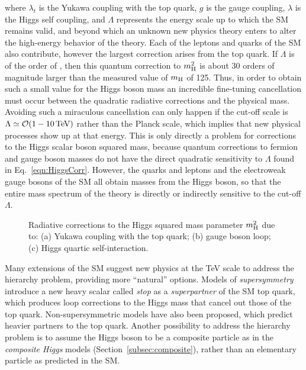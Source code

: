 \noindent where $\lambda_t$ is the Yukawa coupling with the top quark, $g$ is the gauge coupling, $\lambda$ is the Higgs self coupling, and $\Lambda$ represents the energy scale up to which the SM remains valid, and beyond which an unknown new physics theory enters to alter the high-energy behavior of the theory.
Each of the leptons and quarks of the SM also contribute, however the largest correction arises from the top quark.
If $\Lambda$ is of the order of \MPl, then this quantum correction to $m^2_\mathrm{H}$ is about 30 orders of magnitude larger than the measured value of $m_\mathrm{H}$ of 125\GeV.
Thus, in order to obtain such a small value for the Higgs boson mass an incredible fine-tuning cancellation must occur between the quadratic radiative corrections and the physical mass.
Avoiding such a miraculous cancellation can only happen if the cut-off scale is $\Lambda \simeq \mathcal{O}(1 - 10\,\text{Te\hspace{-.08em}V})$ rather than the Planck scale, which implies that new physical processes show up at that energy.
This is only directly a problem for corrections to the Higgs scalar boson squared mass, because quantum corrections to fermion and gauge boson masses do not have the direct
quadratic sensitivity to $\Lambda$ found in Eq.~\ref{eqn:HiggsCorr}. However, the quarks and leptons and the electroweak gauge bosons of the SM all obtain masses from the Higgs boson,
so that the entire mass spectrum of the theory is directly or indirectly sensitive to the cut-off $\Lambda$.

\begin{figure}[!htb]
 \centering
 \caption{Radiative corrections to the Higgs squared mass parameter $m^2_\mathrm{H}$ due to: (a) Yukawa coupling with the top quark; (b) gauge boson loop; (c) Higgs quartic self-interaction.}
 \label{fig:HiggsLoop}
\end{figure}

Many extensions of the SM suggest new physics at the TeV scale to address the hierarchy problem, providing more ``natural'' options.
Models of \textit{supersymmetry}~\cite{PhysRevD.24.1681,Casas:1994qy} introduce a new heavy scalar called \textit{stop} as a \textit{superpartner} of the SM top quark,
which produces loop corrections to the Higgs mass that cancel out those of the top quark.
Non-supersymmetric models have also been proposed, which predict heavier partners to the top quark.
Another possibility to address the hierarchy problem is to assume the Higgs boson to be a composite particle as in the \textit{composite Higgs} models (Section~\ref{subsec:composite}),
rather than an elementary particle as predicted in the SM. %

